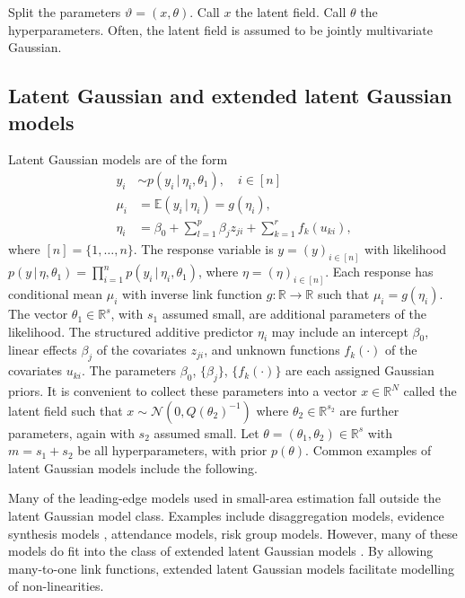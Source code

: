\documentclass[a4paper, nobind]{templates/ociamthesis}
\begin{document}
Split the parameters \(\vartheta = (x, \theta)\).
Call \(x\) the latent field.
Call \(\theta\) the hyperparameters.
Often, the latent field is assumed to be jointly multivariate Gaussian.

\hypertarget{latent-gaussian-and-extended-latent-gaussian-models}{%
\subsection{Latent Gaussian and extended latent Gaussian models}\label{latent-gaussian-and-extended-latent-gaussian-models}}

Latent Gaussian models \autocite{rue2009approximate} are of the form
\begin{align*}
y_i &\sim p(y_i \, | \, \eta_i, \theta_1), \quad i \in [n]\\
\mu_i &= \mathbb{E}(y_i \, | \, \eta_i) = g(\eta_i), \\
\eta_i &= \beta_0 + \sum_{l = 1}^{p} \beta_j z_{ji} + \sum_{k = 1}^{r} f_k(u_{ki}),
\end{align*}
where \([n] = \{1, \ldots, n\}\).
The response variable is \(y = (y)_{i \in [n]}\) with likelihood \(p(y \, | \, \eta, \theta_1) = \prod_{i = 1}^n p(y_i \, | \, \eta_i, \theta_1)\), where \(\eta = (\eta)_{i \in [n]}\).
Each response has conditional mean \(\mu_i\) with inverse link function \(g: \mathbb{R} \to \mathbb{R}\) such that \(\mu_i = g(\eta_i)\).
The vector \(\theta_1 \in \mathbb{R}^s\), with \(s_1\) assumed small, are additional parameters of the likelihood.
The structured additive predictor \(\eta_i\) may include an intercept \(\beta_0\), linear effects \(\beta_j\) of the covariates \(z_{ji}\), and unknown functions \(f_k(\cdot)\) of the covariates \(u_{ki}\).
The parameters \(\beta_0\), \(\{\beta_j\}\), \(\{f_k(\cdot)\}\) are each assigned Gaussian priors.
It is convenient to collect these parameters into a vector \(x \in \mathbb{R}^N\) called the latent field such that \(x \sim \mathcal{N}(0, Q(\theta_2)^{-1})\) where \(\theta_2 \in \mathbb{R}^{s_2}\) are further parameters, again with \(s_2\) assumed small.
Let \(\theta = (\theta_1, \theta_2) \in \mathbb{R}^s\) with \(m = s_1 + s_2\) be all hyperparameters, with prior \(p(\theta)\).
Common examples of latent Gaussian models include the following.

Many of the leading-edge models used in small-area estimation fall outside the latent Gaussian model class.
Examples include disaggregation models, evidence synthesis models \autocite{eaton2019joint,eaton2021naomi}, attendance models, risk group models.
However, many of these models do fit into the class of extended latent Gaussian models \autocite{stringer2021fast}.
By allowing many-to-one link functions, extended latent Gaussian models facilitate modelling of non-linearities.
\end{document}
